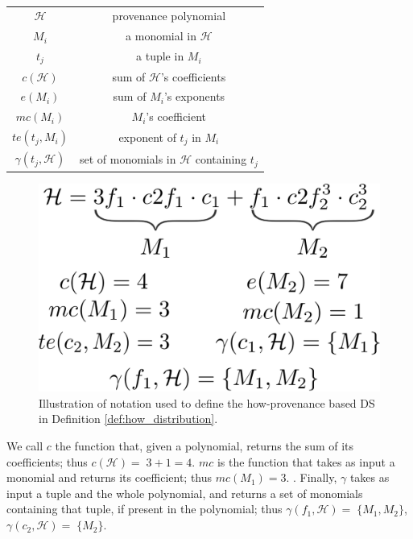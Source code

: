 \begin{table}[]
    \centering
    \caption{}
    \begin{tabular}{c|c}
    \hline
         $\mathcal{H}$ & provenance polynomial  \\
         $M_i$ & a monomial in $\mathcal{H}$ \\
         $t_j$ & a tuple in $M_i$ \\
         $c(\mathcal{H})$ & sum of $\mathcal{H}$'s coefficients \\
         $e(M_i)$ & sum of $M_i$'s exponents \\
         $mc(M_i)$ & $M_i$'s coefficient \\
         $te(t_j, M_i)$ & exponent of $t_j$ in $M_i$ \\
         $\gamma(t_j, \mathcal{H})$ & set of monomials in $\mathcal{H}$ containing $t_j$ \\
    \hline
    \end{tabular}
    \label{tab:notation}
\end{table}


\begin{figure}[]
\centering
  \includegraphics[width=.4\textwidth]{figures/how_example}
  \caption{Illustration of notation used to define the how-provenance based DS in Definition \ref{def:how_distribution}.}
  \label{figure:how_example}
\end{figure}

We call $c$ the function that, given a polynomial, returns the sum of its coefficients; thus $c(\mathcal{H})=\;3+1=4$. 
$mc$ is the function that takes as input a monomial and returns its coefficient; thus $mc(M_1) = 3$. 
. 
Finally, $\gamma$ takes as input a tuple and the whole polynomial, and returns a set of monomials containing that tuple, if present in the polynomial; thus $\gamma(f_1, \mathcal{H})=\;\{M_1, M_2\}$, $\gamma(c_2, \mathcal{H})=\;\{M_2\}$. 

